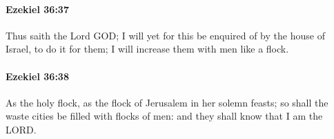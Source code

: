 		\paragraph{Ezekiel 36:37} %
			\label{EZEKIEL-36-37}

			Thus saith the Lord GOD; I will yet for this be enquired of by the house of Israel, to do it for them; I will increase them with men like a flock.


		\paragraph{Ezekiel 36:38} %
			\label{EZEKIEL-36-38}

			As the holy flock, as the flock of Jerusalem in her solemn feasts; so shall the waste cities be filled with flocks of men: and they shall know that I am the LORD.

